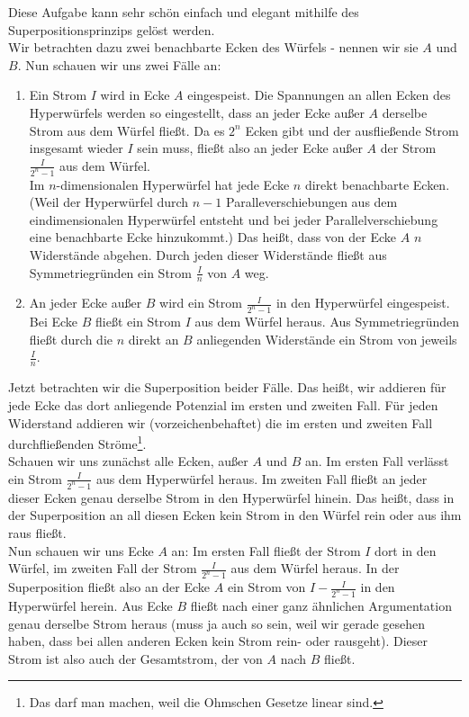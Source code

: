 \begin{Answer}[ref = hypercube]
	Diese Aufgabe kann sehr schön einfach und elegant mithilfe des Superpositionsprinzips gelöst werden.\\
	Wir betrachten dazu zwei benachbarte Ecken des Würfels - nennen wir sie $A$ und $B$. Nun schauen wir uns zwei Fälle an:
	\begin{enumerate}
	\item Ein Strom $I$ wird in Ecke $A$ eingespeist. Die Spannungen an allen Ecken des Hyperwürfels werden so eingestellt, 	dass an jeder Ecke außer $A$ derselbe Strom aus dem Würfel fließt. Da es $2^n$ Ecken gibt und der ausfließende Strom 		insgesamt wieder $I$ sein muss, fließt also an jeder Ecke außer $A$ der Strom $\frac{I}{2^n-1}$ aus dem Würfel.\\
	Im $n$-dimensionalen Hyperwürfel hat jede Ecke $n$ direkt benachbarte Ecken. (Weil der Hyperwürfel durch $n-1$ 			Paralleverschiebungen aus dem eindimensionalen Hyperwürfel entsteht und bei jeder Parallelverschiebung eine benachbarte 	Ecke hinzukommt.) Das heißt, dass von der Ecke $A$ $n$ Widerstände abgehen. Durch jeden dieser Widerstände fließt aus 		Symmetriegründen ein Strom $\frac{I}{n}$ von $A$ weg.
	\item An jeder Ecke außer $B$ wird ein Strom $\frac{I}{2^n-1}$ in den Hyperwürfel eingespeist. Bei Ecke $B$ fließt ein 		Strom $I$ aus dem Würfel heraus. Aus Symmetriegründen fließt durch die $n$ direkt an $B$ anliegenden Widerstände ein Strom 	   von jeweils $\frac{I}{n}$.  
	\end{enumerate}
	Jetzt betrachten wir die Superposition beider Fälle. Das heißt, wir addieren für jede Ecke das dort anliegende Potenzial im 	    ersten und zweiten Fall. Für jeden Widerstand addieren wir (vorzeichenbehaftet) die im ersten und zweiten Fall 		durchfließenden Ströme\footnote{Das darf man machen, weil die Ohmschen Gesetze linear sind.}.\\
	Schauen wir uns zunächst alle Ecken, außer $A$ und $B$ an. Im ersten Fall verlässt ein Strom $\frac{I}{2^n-1}$ aus dem 		Hyperwürfel heraus. Im zweiten Fall fließt an jeder dieser Ecken genau derselbe Strom in den Hyperwürfel hinein. Das heißt, 	    dass in der Superposition an all diesen Ecken kein Strom in den Würfel rein oder aus ihm raus fließt.\\
	Nun schauen wir uns Ecke $A$ an: Im ersten Fall fließt der Strom $I$ dort in den Würfel, im zweiten Fall der Strom 		$\frac{I}{2^n-1}$ aus dem Würfel heraus. In der Superposition fließt also an der Ecke $A$ ein Strom von $I-\frac{I}{2^n-1}$    	       in den Hyperwürfel herein. Aus Ecke $B$ fließt nach einer ganz ähnlichen Argumentation genau derselbe Strom heraus (muss ja auch so sein, weil wir gerade gesehen haben, dass bei allen anderen Ecken kein Strom rein- oder rausgeht). Dieser Strom ist also auch der Gesamtstrom, der von $A$ nach $B$ fließt.\\

\end{Answer}
